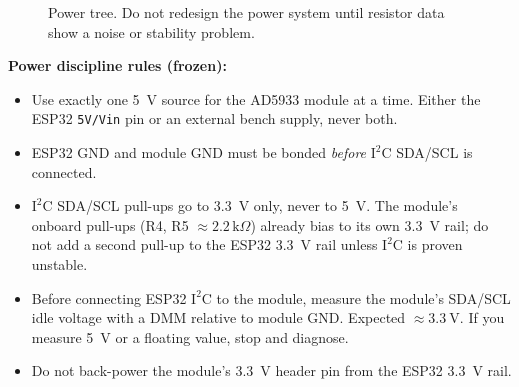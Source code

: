 \documentclass[11pt,a4paper]{article}
\newcommand{\kohm}[1]{\ensuremath{#1\,\mathrm{k}\Omega}}
\begin{document}
\begin{figure}[!ht]
\centering
{}
\caption{Power tree. Do not redesign the power system until resistor data show a noise or stability problem.}
\label{fig:power_tree}
\end{figure}

\begin{rulebox}
\textbf{Power discipline rules (frozen):}
\begin{itemize}
\item Use exactly one \SI{5}{\volt} source for the AD5933 module at a time. Either the ESP32 \texttt{5V/Vin} pin or an external bench supply, never both.
\item ESP32 GND and module GND must be bonded \emph{before} $\mathrm{I^2C}$ SDA/SCL is connected.
\item $\mathrm{I^2C}$ SDA/SCL pull-ups go to \SI{3.3}{\volt} only, never to \SI{5}{\volt}. The module's onboard pull-ups (R4, R5 $\approx \kohm{2.2}$) already bias to its own \SI{3.3}{\volt} rail; do not add a second pull-up to the ESP32 \SI{3.3}{\volt} rail unless $\mathrm{I^2C}$ is proven unstable.
\item Before connecting ESP32 $\mathrm{I^2C}$ to the module, measure the module's SDA/SCL idle voltage with a DMM relative to module GND. Expected $\approx \SI{3.3}{\volt}$. If you measure \SI{5}{\volt} or a floating value, stop and diagnose.
\item Do not back-power the module's \SI{3.3}{\volt} header pin from the ESP32 \SI{3.3}{\volt} rail.
\end{itemize}
\end{rulebox}
\end{document}
